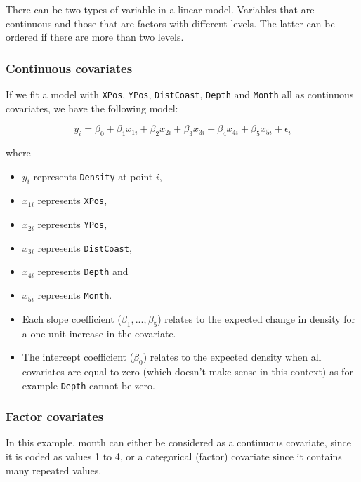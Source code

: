 \documentclass[
  oneside]{krantz}
\begin{document}
There can be two types of variable in a linear model. Variables that are continuous and those that are factors with different levels. The latter can be ordered if there are more than two levels.

\hypertarget{continuous-covariates}{%
\subsubsection{Continuous covariates}\label{continuous-covariates}}

If we fit a model with \texttt{XPos}, \texttt{YPos}, \texttt{DistCoast}, \texttt{Depth} and \texttt{Month} all as continuous covariates, we have the following model:

\[
y_{i} =  \beta_0 + \beta_1x_{1i} + \beta_2x_{2i} +\beta_3x_{3i} +\beta_4x_{4i}+\beta_5x_{5i}+\epsilon_{i}
\label{eq:linregdata}
\]

where

\begin{itemize}
\item
  \(y_{i}\) represents \texttt{Density} at point \(i\),
\item
  \(x_{1i}\) represents \texttt{XPos},
\item
  \(x_{2i}\) represents \texttt{YPos},
\item
  \(x_{3i}\) represents \texttt{DistCoast},
\item
  \(x_{4i}\) represents \texttt{Depth} and
\item
  \(x_{5i}\) represents \texttt{Month}.
\item
  Each slope coefficient (\(\beta_1,...,\beta_5\)) relates to the expected change in density for a one-unit increase in the covariate.
\item
  The intercept coefficient (\(\beta_0\)) relates to the expected density when all covariates are equal to zero (which doesn't make sense in this context) as for example \texttt{Depth} cannot be zero.
\end{itemize}

\hypertarget{factor-covariates}{%
\subsubsection{Factor covariates}\label{factor-covariates}}

In this example, month can either be considered as a continuous covariate, since it is coded as values 1 to 4, or a categorical (factor) covariate since it contains many repeated values.
\end{document}
